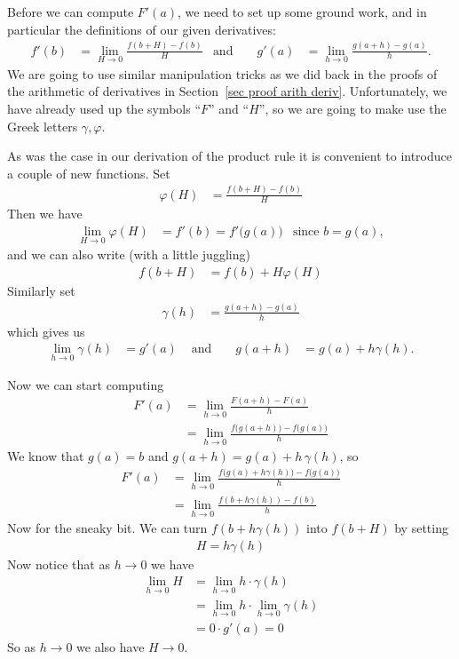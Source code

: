 Before we can compute $F'(a)$, we need to set up some
ground work, and in particular the definitions of our given derivatives:
\begin{align*}
  f'(b) &= \lim_{H \to 0} \frac{f(b+H)-f(b)}{H} & \text{and }&&
  g'(a) &= \lim_{h \to 0} \frac{g(a+h)-g(a)}{h}.
\end{align*}
We are going to use similar manipulation tricks as we did back in the proofs of the
arithmetic of derivatives in Section~\ref{sec proof arith deriv}. Unfortunately, we have
already used up the symbols ``$F$'' and ``$H$'', so we are going to make use the Greek
letters $\gamma, \varphi$.

\newcommand{\tf}{\varphi}
\newcommand{\tg}{\gamma}

As was the case in our derivation of the product rule it is convenient to
introduce a couple of new functions. Set
\begin{align*}
  \tf(H) &= \frac{f(b+H)-f(b)}{H}
\end{align*}
Then we have
\begin{align}\label{eq:DIFFcrtildef}
  \lim_{H \to 0} \tf(H) &= f'(b) = f'\big(g(a)\big) & \text{since $b=g(a)$},
\end{align}
and we can also write (with a little juggling)
\begin{align*}
  f(b+H) &= f(b) + H \tf(H)
\end{align*}
Similarly set
\begin{align*}
  \tg(h) &= \frac{g(a+h)-g(a)}{h}
\end{align*}
which gives us
\begin{align*}%
  \lim_{h \to 0} \tg(h) &= g'(a)
  & \text{ and } &&
  g(a+h) &= g(a) + h \tg(h).
\end{align*}

Now we can start computing
\begin{align*}
  F'(a) &= \lim_{h \to 0} \frac{F(a+h)-F(a)}{h} \\
  &= \lim_{h \to 0} \frac{f\big(g(a+h)\big)-f\big(g(a)\big)}{h}
\end{align*}
We know that $g(a) = b$ and $g(a+h) = g(a) + h\,\tg(h)$, so
\begin{align*}
  F'(a)
  &= \lim_{h \to 0} \frac{f\big(g(a) + h\tg(h) \big)-f\big(g(a)\big)}{h} \\
  &= \lim_{h \to 0} \frac{f(b + h\tg(h) )-f(b)}{h}
\end{align*}
Now for the sneaky bit. We can turn $f(b + h\tg(h) )$
into $f(b+H)$ by setting
\begin{align*}
H = h\tg(h)
\end{align*}
Now notice that as $h \to 0$ we have
\begin{align*}
  \lim_{h \to 0} H &= \lim_{h \to 0} h \cdot \tg(h) \\
  &= \lim_{h \to 0} h \cdot \lim_{h \to 0} \tg(h) \\
  &= 0 \cdot g'(a) = 0
\end{align*}
So as $h\to 0$ we also have $H \to 0$.

